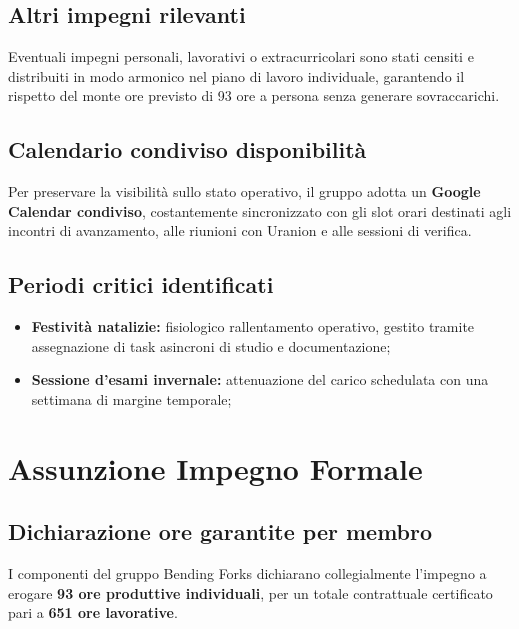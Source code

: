 \documentclass[12pt,a4paper]{article}
\newcommand{\tightlist}{\setlength{\itemsep}{1pt}\setlength{\parskip}{0pt}}
\begin{document}
\hypertarget{altri-impegni-rilevanti}{%
\subsection{Altri impegni rilevanti}}
Eventuali impegni personali, lavorativi o extracurricolari sono stati censiti e distribuiti in modo armonico nel piano di lavoro individuale, garantendo il rispetto del monte ore previsto di 93 ore a persona senza generare sovraccarichi.


\hypertarget{calendario-condiviso-disponibilita}{%
\subsection{Calendario condiviso disponibilità}}
Per preservare la visibilità sullo stato operativo, il gruppo adotta un \textbf{Google Calendar condiviso}, costantemente sincronizzato con gli slot orari destinati agli incontri di avanzamento, alle riunioni con Uranion e alle sessioni di verifica.

\hypertarget{periodi-critici-identificati}{%
\subsection{Periodi critici identificati}}
\begin{itemize}
\tightlist
\item \textbf{Festività natalizie:} fisiologico rallentamento operativo, gestito tramite assegnazione di task asincroni di studio e documentazione;
\item \textbf{Sessione d'esami invernale:} attenuazione del carico schedulata con una settimana di margine temporale;

\end{itemize}


\hypertarget{assunzione-impegno-formale}{%
\section{Assunzione Impegno Formale}}

\hypertarget{dichiarazione-ore-garantite-per-membro}{%
\subsection{Dichiarazione ore garantite per membro}}
I componenti del gruppo Bending Forks dichiarano collegialmente l'impegno a erogare \textbf{93 ore produttive individuali}, per un totale contrattuale certificato pari a \textbf{651 ore lavorative}.
\end{document}
